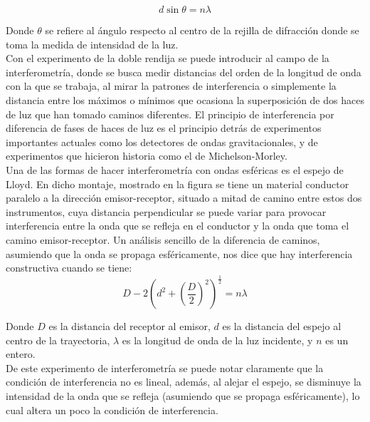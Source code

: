 \documentclass[%
 reprint,
 amsmath,amssymb,
 aps,
]{revtex4-1}
\begin{document}
\begin{equation}
d\sin{\theta} = n\lambda
\end{equation}

Donde $\theta$ se refiere al ángulo respecto al centro de la rejilla de difracción donde se toma la medida de intensidad de la luz.\\

Con el experimento de la doble rendija se puede introducir al campo de la interferometría, donde se busca medir distancias del orden de la longitud de onda con la que se trabaja, al mirar la patrones de interferencia o simplemente la distancia entre los máximos o mínimos que ocasiona la superposición de dos haces de luz que han tomado caminos diferentes. El principio de interferencia por diferencia de fases de haces de luz es el principio detrás de experimentos importantes actuales como los detectores de ondas gravitacionales, y de experimentos que hicieron historia como el de Michelson-Morley.\\

Una de las formas de hacer interferometría con ondas esféricas es el espejo de Lloyd. En dicho montaje, mostrado en la figura \cite{fig:Lloyd} se tiene un material conductor paralelo a la dirección emisor-receptor, situado a mitad de camino entre estos dos instrumentos, cuya distancia perpendicular se puede variar para provocar interferencia entre la onda que se refleja en el conductor y la onda que toma el camino emisor-receptor. Un análisis sencillo de la diferencia de caminos, asumiendo que la onda se propaga esféricamente, nos dice que hay interferencia constructiva cuando se tiene:\\

\begin{equation}
D-2{\left(d^2 + {\left(\frac{D}{2}\right)}^2\right)}^\frac{1}{2} = n\lambda
\label{Lloyd}
\end{equation}

Donde $D$ es la distancia del receptor al emisor, $d$ es la distancia del espejo al centro de la trayectoria, $\lambda$ es la longitud de onda de la luz incidente, y $n$ es un entero.\\

De este experimento de interferometría se puede notar claramente que la condición de interferencia no es lineal, además, al alejar el espejo, se disminuye la intensidad de la onda que se refleja (asumiendo que se propaga esféricamente), lo cual altera un poco la condición de interferencia.\\
\end{document}
